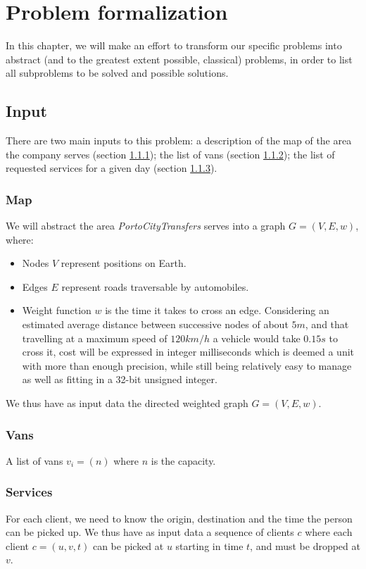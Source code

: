 \chapter{Problem formalization}
In this chapter, we will make an effort to transform our specific problems into abstract (and to the greatest extent possible, classical) problems, in order to list all subproblems to be solved and possible solutions.
\section{Input}
There are two main inputs to this problem: a description of the map of the area the company serves (section \ref{input-map}); the list of vans (section \ref{input-vans}); the list of requested services for a given day (section \ref{input-services}).
\subsection{Map} \label{input-map}
We will abstract the area \emph{PortoCityTransfers} serves into a graph $G=(V,E, w)$, where:
\begin{itemize}
    \item Nodes $V$ represent positions on Earth.
    \item Edges $E$ represent roads traversable by automobiles.
    \item Weight function $w$ is the time it takes to cross an edge. Considering an estimated average distance between successive nodes of about $5 m$, and that travelling at a maximum speed of $120 km/h$ a vehicle would take $0.15 s$ to cross it, cost will be expressed in integer milliseconds which is deemed a unit with more than enough precision, while still being relatively easy to manage as well as fitting in a 32-bit unsigned integer.
\end{itemize}
We thus have as input data the directed weighted graph $G=(V,E,w)$.
\subsection{Vans} \label{input-vans}
A list of vans $v_i=(n)$ where $n$ is the capacity.
\subsection{Services} \label{input-services}
For each client, we need to know the origin, destination and the time the person can be picked up.
We thus have as input data a sequence of clients $c$ where each client $c=(u, v, t)$ can be picked at $u$ starting in time $t$, and must be dropped at $v$.

